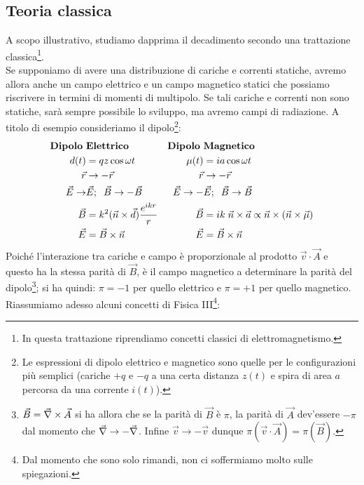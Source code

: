 \subsection{Teoria classica} A scopo illustrativo, studiamo dapprima il decadimento secondo una trattazione classica\footnote{In questa trattazione riprendiamo concetti classici di elettromagnetismo.}.\\
Se supponiamo di avere una distribuzione di cariche e correnti statiche, avremo allora anche un campo elettrico e un campo magnetico statici che possiamo riscrivere in termini di momenti di multipolo. Se tali cariche e correnti non sono statiche, sarà sempre possibile lo sviluppo, ma avremo campi di radiazione. A titolo di esempio consideriamo il dipolo\footnote{Le espressioni di dipolo elettrico e magnetico sono quelle per le configurazioni più semplici (cariche $+q$ e $-q$ a una certa distanza $z(t)$ e spira di area $a$ percorsa da una corrente $i(t)$).}:
\begin{displaymath}
\begin{aligned}
\text{\textbf{Dipolo} }&\text{\textbf{Elettrico}}\index{dipolo!elettrico} & \text{\textbf{Dipolo} }&\text{\textbf{Magnetico}}\index{dipolo!magnetico} \\
d(t) &= qz \cos{\omega t} & \mu(t)&= i a \cos{\omega t} \\
\vec{r}&\to-\vec{r} & \vec{r}&\to-\vec{r} \\
 \vec{E}\to&\vec{E};\;\; \vec{B}\to-\vec{B}\quad & \vec{E}\to-&\vec{E}; \;\; \vec{B}\to\vec{B} \\
\vec{B} &= k^2 (\vec{n}\times \vec{d}) \frac{e^{ikr}}{r} & \vec{B}&= ik\; \vec{n}\times \vec{a} \propto \vec{n} \times (\vec{n}\times \vec{\mu}) \\
\vec{E} &= \vec{B}\times \vec{n} & \vec{E} &= \vec{B}\times \vec{n} 
\end{aligned}
\end{displaymath}
Poiché l'interazione tra cariche e campo è proporzionale al prodotto $\vec{v}\cdot\vec{A}$ e questo ha la stessa parità di $\vec{B}$, è il campo magnetico a determinare la parità del dipolo\footnote{$\vec{B} = \vec{\nabla}\times\vec{A}$ si ha allora che se la parità di $\vec{B}$ è $\pi$, la parità di $\vec{A}$ dev'essere $-\pi$ dal momento che $\vec{\nabla} \to -\vec{\nabla}$. Infine $\vec{v}\to -\vec{v}$ dunque $\pi(\vec{v}\cdot\vec{A}) = \pi(\vec{B})$.}; si ha quindi: $\pi=-1$ per quello elettrico e $\pi=+1$ per quello magnetico.\\
Riassumiamo adesso alcuni concetti di Fisica III\footnote{Dal momento che sono solo rimandi, non ci soffermiamo molto sulle spiegazioni.}:

